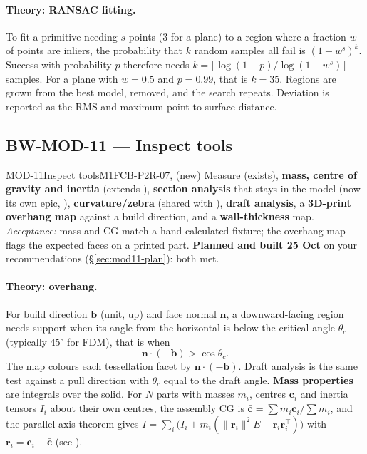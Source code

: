 \paragraph{Theory: RANSAC fitting.} To fit a primitive needing $s$ points (3 for a plane) to a region
where a fraction $w$ of points are inliers, the probability that $k$ random samples all fail is
$(1-w^s)^k$. Success with probability $p$ therefore needs $k=\lceil\log(1-p)/\log(1-w^s)\rceil$ samples.
For a plane with $w=0.5$ and $p=0.99$, that is $k=35$. Regions are grown from the best model, removed, and
the search repeats. Deviation is reported as the RMS and maximum point-to-surface distance.

\subsection{BW-MOD-11 --- Inspect tools}

\begin{epic}{MOD-11}{Inspect tools}{M1}{\stDone}{FCB-P2R-07, (new)}
Measure (exists), \textbf{mass, centre of gravity and inertia} (extends ), \textbf{section
analysis} that stays in the model (now its own epic, ), \textbf{curvature/zebra} (shared with ), \textbf{draft
analysis}, a \textbf{3D-print overhang map} against a build direction, and a \textbf{wall-thickness} map.
\emph{Acceptance:} mass and CG match a hand-calculated fixture; the overhang map flags the expected faces on a
printed part. \textbf{Planned and built 25 Oct} on your recommendations (\S\ref{sec:mod11-plan}): both met.
\end{epic}

\paragraph{Theory: overhang.} For build direction $\mathbf b$ (unit, up) and face normal $\mathbf n$, a
downward-facing region needs support when its angle from the horizontal is below the critical angle
$\theta_c$ (typically 45$^\circ$ for FDM), that is when
\[
  \mathbf n\cdot(-\mathbf b) > \cos\theta_c .
\]
The map colours each tessellation facet by $\mathbf n\cdot(-\mathbf b)$. Draft analysis is the same test
against a pull direction with $\theta_c$ equal to the draft angle. \textbf{Mass properties} are integrals
over the solid. For $N$ parts with masses $m_i$, centres $\mathbf c_i$ and inertia tensors $I_i$ about their
own centres, the assembly CG is $\bar{\mathbf c}=\sum m_i\mathbf c_i/\sum m_i$, and the parallel-axis theorem
gives $I=\sum_i\big(I_i+m_i(\lVert\mathbf r_i\rVert^2E-\mathbf r_i\mathbf r_i^{\!\top})\big)$ with
$\mathbf r_i=\mathbf c_i-\bar{\mathbf c}$ (see ).


